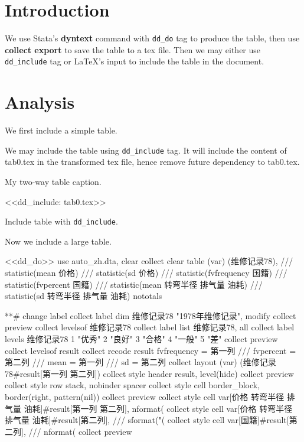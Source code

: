 \documentclass{ctexart}
\begin{document}
\section{Introduction}
We use Stata's \textbf{dyntext} command with \texttt{dd\_do} tag 
to produce the table, then use \textbf{collect export} to save 
the table to a tex file. Then we may either use 
\texttt{dd\_include} tag or LaTeX's input to include 
the table in the document. 

\section{Analysis}
We first include a simple table.

\iffalse
<<dd_do>>
use auto_zh.dta, clear
collect clear
table (国籍 维修记录78) (), totals(维修记录78)
collect export tab0.tex, tableonly replace
<</dd_do>>
\fi

We may include the table using \texttt{dd\_include} tag. It will 
include the content of tab0.tex in the transformed tex file, hence 
remove future dependency to tab0.tex.  

\begin{table}[H]
\centering
\caption{My two-way table caption.}
<<dd_include: tab0.tex>>
\caption{Include table with \texttt{dd\_include}.}
\end{table}


Now we include a large table.

\iffalse
<<dd_do>>
use auto_zh.dta, clear
collect clear
table (var) (维修记录78),              ///
      statistic(mean 价格)          ///
      statistic(sd 价格)				///      
	  statistic(fvfrequency 国籍)  ///
      statistic(fvpercent 国籍)     ///
      statistic(mean 转弯半径 排气量 油耗)          ///
      statistic(sd  转弯半径 排气量 油耗) nototals



**# change label	  
collect label dim 维修记录78 "1978年维修记录", modify
collect preview
collect levelsof 维修记录78
collect label list 维修记录78, all
collect label levels 维修记录78 1 "优秀" 2 "良好" 3 "合格" 4 "一般" 5 "差"
collect preview
collect levelsof result
collect recode result fvfrequency = 第一列 ///
                      fvpercent   = 第二列 ///
                      mean        = 第一列 ///
                      sd          = 第二列
collect layout (var) (维修记录78#result[第一列 第二列])
collect style header result, level(hide)
collect preview
collect style row stack, nobinder spacer
collect style cell border_block, border(right, pattern(nil))
collect preview
collect style cell var[价格 转弯半径 排气量 油耗]#result[第一列 第二列], nformat(%
collect style cell var[价格 转弯半径 排气量 油耗]#result[第二列], ///
        sformat("(%
collect style cell var[国籍]#result[第二列], ///
        nformat(%
collect preview
\end{document}
